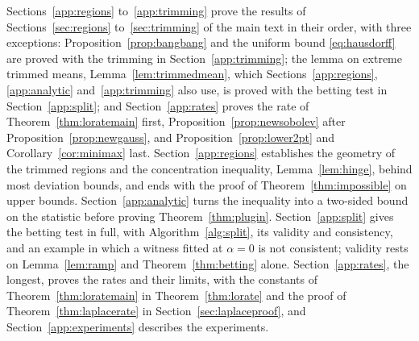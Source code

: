 Sections~\ref{app:regions} to~\ref{app:trimming} prove the results of Sections~\ref{sec:regions} to~\ref{sec:trimming}
of the main text in their order, with three exceptions: Proposition~\ref{prop:bangbang} and the uniform bound
\eqref{eq:hausdorff} are proved with the trimming in Section~\ref{app:trimming}; the lemma on extreme trimmed means,
Lemma~\ref{lem:trimmedmean}, which Sections~\ref{app:regions}, \ref{app:analytic} and~\ref{app:trimming} also use, is
proved with the betting test in Section~\ref{app:split}; and Section~\ref{app:rates} proves the rate of
Theorem~\ref{thm:loratemain} first, Proposition~\ref{prop:newsobolev} after Proposition~\ref{prop:newgauss}, and Proposition~\ref{prop:lower2pt} and Corollary~\ref{cor:minimax} last.
Section~\ref{app:regions} establishes the geometry of the trimmed regions and the concentration inequality,
Lemma~\ref{lem:hinge}, behind most deviation bounds, and ends with the proof of Theorem~\ref{thm:impossible} on upper
bounds. Section~\ref{app:analytic} turns the inequality into a two-sided bound on the statistic before proving
Theorem~\ref{thm:plugin}. Section~\ref{app:split} gives the betting test in full, with Algorithm~\ref{alg:split}, its
validity and consistency, and an example in which a witness fitted at $\alpha=0$ is not consistent; validity rests on
Lemma~\ref{lem:ramp} and Theorem~\ref{thm:betting} alone. Section~\ref{app:rates}, the longest, proves the rates and
their limits, with the constants of Theorem~\ref{thm:loratemain} in Theorem~\ref{thm:lorate} and the proof of
Theorem~\ref{thm:laplacerate} in Section~\ref{sec:laplaceproof}, and Section~\ref{app:experiments} describes the
experiments.

